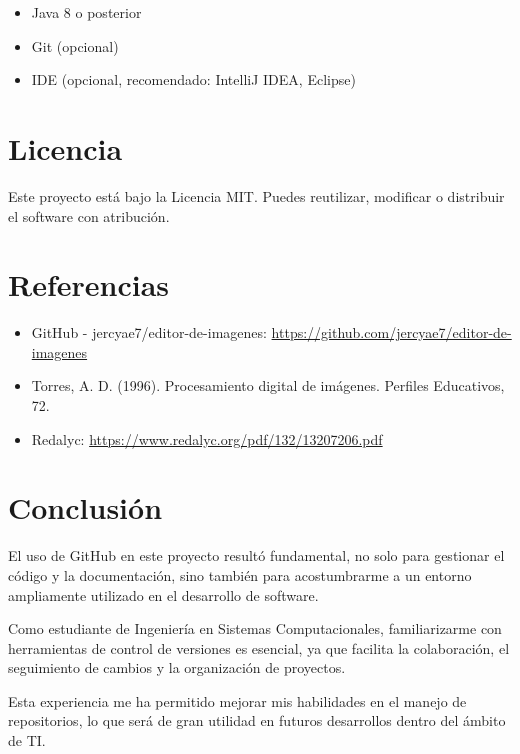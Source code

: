 \documentclass[12pt]{article}
\begin{document}
\begin{itemize}
    \item Java 8 o posterior
    \item Git (opcional)
    \item IDE (opcional, recomendado: IntelliJ IDEA, Eclipse)
\end{itemize}

\section{Licencia}

Este proyecto está bajo la Licencia MIT. Puedes reutilizar, modificar o distribuir el software con atribución.

\section{Referencias}

\begin{itemize}
    \item GitHub - jercyae7/editor-de-imagenes: \url{https://github.com/jercyae7/editor-de-imagenes}
    \item Torres, A. D. (1996). Procesamiento digital de imágenes. Perfiles Educativos, 72.
    \item Redalyc: \url{https://www.redalyc.org/pdf/132/13207206.pdf}
\end{itemize}

\section{Conclusión}

El uso de GitHub en este proyecto resultó fundamental, no solo para gestionar el código y la documentación, sino también para acostumbrarme a un entorno ampliamente utilizado en el desarrollo de software.

Como estudiante de Ingeniería en Sistemas Computacionales, familiarizarme con herramientas de control de versiones es esencial, ya que facilita la colaboración, el seguimiento de cambios y la organización de proyectos.

Esta experiencia me ha permitido mejorar mis habilidades en el manejo de repositorios, lo que será de gran utilidad en futuros desarrollos dentro del ámbito de TI.
\end{document}
